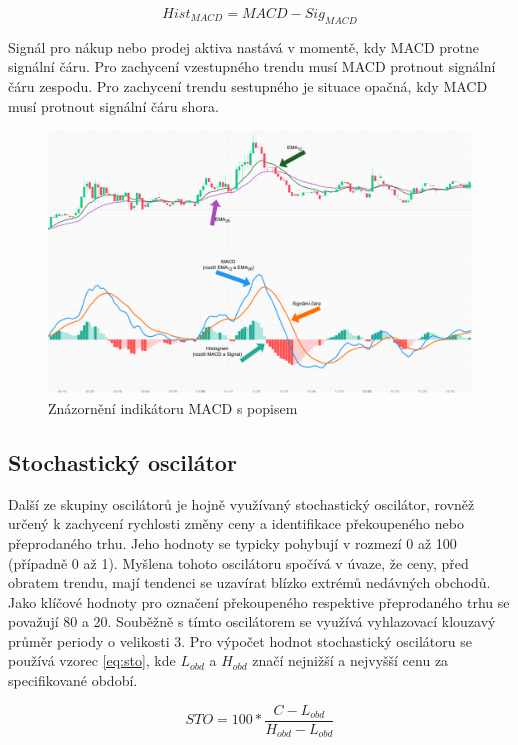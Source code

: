 \begin{equation}
    Hist_{MACD} = MACD - Sig_{MACD}
    \label{eq:macdhist}
\end{equation}

Signál pro nákup nebo prodej aktiva nastává v momentě, kdy MACD protne signální čáru. Pro zachycení vzestupného trendu musí MACD protnout signální čáru zespodu. Pro zachycení
trendu sestupného je situace opačná, kdy MACD musí protnout signální čáru shora. %

\begin{figure}[h]
    \centering
    \includegraphics[width=1\textwidth]{Figures/MACD.pdf}
    \caption{Znázornění indikátoru MACD s popisem}
    \label{fig:macd}
\end{figure}

\subsection{Stochastický oscilátor}
Další ze skupiny oscilátorů je hojně využívaný stochastický oscilátor, rovněž určený k zachycení rychlosti změny ceny a identifikace překoupeného nebo přeprodaného trhu. Jeho
hodnoty se typicky pohybují v rozmezí 0 až 100 (případně 0 až 1). Myšlena tohoto oscilátoru spočívá v úvaze, že ceny, před obratem trendu, mají tendenci se uzavírat blízko extrémů
nedávných obchodů. Jako klíčové hodnoty pro označení překoupeného respektive přeprodaného trhu se považují 80 a 20. Souběžně s tímto oscilátorem se využívá vyhlazovací
klouzavý průměr periody o velikosti 3. Pro výpočet hodnot stochastický oscilátoru se používá vzorec \ref{eq:sto}, kde $L_{obd}$ a $H_{obd}$ značí nejnižší a nejvyšší cenu za specifikované
období.

\begin{equation}
    STO = 100 * \frac{C  - L_{obd}}{H_{obd} - L_{obd}}
    \label{eq:sto}
\end{equation}


